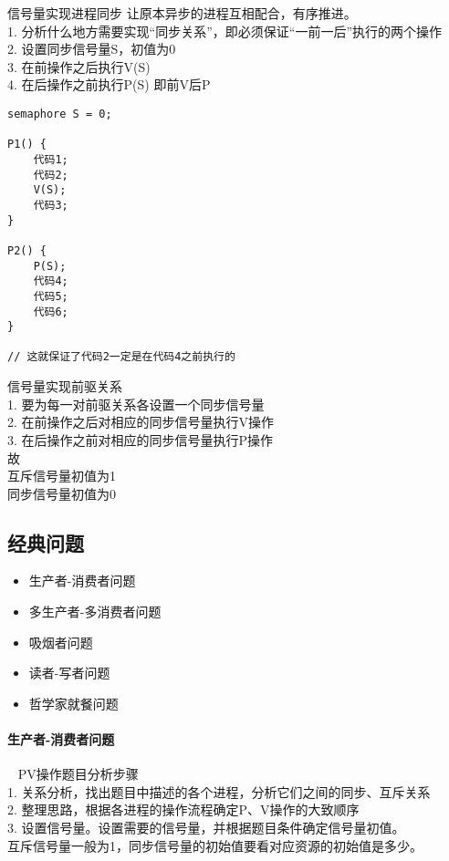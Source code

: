 \noindent
信号量实现进程同步 
让原本异步的进程互相配合，有序推进。\\
1. 分析什么地方需要实现“同步关系”，即必须保证“一前一后”执行的两个操作 \\
2. 设置同步信号量S，初值为0 \\
3. 在前操作之后执行V(S) \\
4. 在后操作之前执行P(S) 即前V后P \\

\begin{lstlisting}
semaphore S = 0;

P1() {
	代码1;
	代码2;
	V(S);
	代码3;
}

P2() {
	P(S);
	代码4;
	代码5;
	代码6;
}

// 这就保证了代码2一定是在代码4之前执行的
\end{lstlisting}

\noindent
信号量实现前驱关系 \\
1. 要为每一对前驱关系各设置一个同步信号量 \\
2. 在前操作之后对相应的同步信号量执行V操作 \\
3. 在后操作之前对相应的同步信号量执行P操作 \\

\noindent
故 \\
互斥信号量初值为1 \\
同步信号量初值为0 \\

\subsection{经典问题}

\begin{itemize}
	\item 生产者-消费者问题
	\item 多生产者-多消费者问题
	\item 吸烟者问题
	\item 读者-写者问题
	\item 哲学家就餐问题
\end{itemize}

\paragraph{生产者-消费者问题}~{}
\newline
PV操作题目分析步骤 \\ 
1. 关系分析，找出题目中描述的各个进程，分析它们之间的同步、互斥关系 \\
2. 整理思路，根据各进程的操作流程确定P、V操作的大致顺序 \\
3. 设置信号量。设置需要的信号量，并根据题目条件确定信号量初值。 \\
互斥信号量一般为1，同步信号量的初始值要看对应资源的初始值是多少。 \\

